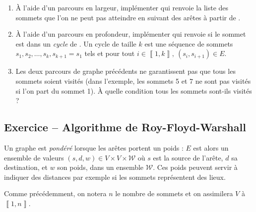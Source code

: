 \documentclass{article}
\newcounter{loop}
\newcounter{numEx}
\newcommand{\exo}[1]{
	\stepcounter{numEx}
	\setcounter{loop}{0}
	\subsection*{Exercice \arabic{numEx} -- #1}
}
\newcommand{\llbra}{\left\llbracket}
\newcommand{\rrbra}{\right\rrbracket}
\renewcommand{\brack}[1]{\ensuremath{\llbra#1\rrbra}}
\newcommand{\paren}[1]{\ensuremath{\left(#1\right)}}
\newcommand{\matr}[2]{\mathcal{M}_{#1}\paren{#2}}
\begin{document}
\begin{enumerate}[resume]
	\item À l'aide d'un parcours en largeur, implémenter  qui renvoie la liste des sommets que l'on ne peut pas atteindre en suivant des arêtes à partir de .
	
	\item À l'aide d'un parcours en profondeur, implémenter  qui renvoie  si le sommet  est dans un \emph{cycle} de . Un cycle de taille $k$ est une séquence de sommets $s_1, s_2, \ldots, s_k, s_{k+1} = s_1$ tels et pour tout $i\in\brack{1,k},\ (s_i,s_{i+1})\in E$.

	\item Les deux parcours de graphe précédents ne garantissent pas que tous les sommets soient visités (dans l'exemple, les sommets 5 et 7 ne sont pas visités si l'on part du sommet 1). À quelle condition tous les sommets sont-ils visités ?

\end{enumerate}

%

\exo{Algorithme de Roy-Floyd-Warshall}

Un graphe est \emph{pondéré} lorsque les arêtes portent un poids : $E$ est alors un ensemble de valeurs $(s, d, w)\in V\times V\times\mathcal W$ où $s$ est la source de l'arête, $d$ sa destination, et $w$ son poids, dans un ensemble $\mathcal W$. Ces poids peuvent servir à indiquer des distances par exemple si les sommets représentent des lieux.

Comme précédemment, on notera $n$ le nombre de sommets et on assimilera $V$ à $\brack{1,n}$.
\end{document}
